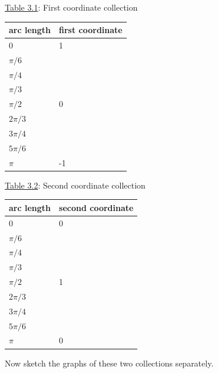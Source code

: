 \documentclass[english]{book}
\begin{document}
\begin{center}

\underline{Table 3.1}: First coordinate collection

\begin{table}[htbp]
\begin{center}
\begin{tabular}{|l|l|}
  \hline 
  arc length  &  first coordinate \\
  \hline
  0           &  1 \\
  $\pi/6$     &    \\
  $\pi/4$     &    \\
  $\pi/3$     &    \\
  $\pi/2$     &  0 \\
  $2\pi/3$    &    \\
  $3\pi/4$    &    \\
  $5\pi/6$    &    \\
  $\pi$       & -1 \\
  \hline
\end{tabular}
\label{tbl3.1}
\end{center}
\end{table}

\underline{Table 3.2}: Second coordinate collection

\begin{table}[htbp]
\begin{center}
\begin{tabular}{|l|l|}
  \hline 
  arc length  &  second coordinate \\
  \hline
  0           & 0 \\
  $\pi/6$     &   \\
  $\pi/4$     &   \\
  $\pi/3$     &   \\
  $\pi/2$     & 1 \\
  $2\pi/3$    &   \\
  $3\pi/4$    &   \\
  $5\pi/6$    &   \\
  $\pi$       & 0 \\
  \hline
\end{tabular}
\label{tbl3.2}
\end{center}
\end{table}

\end{center}


Now sketch the graphs of these two collections separately.

\vspace{0.3cm}
\end{document}
